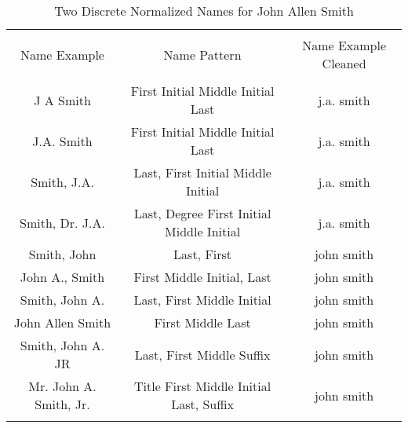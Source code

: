 
\begin{table}[!htbp] \centering 
  \caption{Two Discrete Normalized Names for John Allen Smith} 
  \label{} 
\footnotesize 
\begin{tabular}{@{\extracolsep{5pt}} ccc} 
\\[-1.8ex]\hline 
\hline \\[-1.8ex] 
Name Example & Name Pattern & Name Example Cleaned \\ 
\hline \\[-1.8ex] 
J A Smith & First Initial Middle Initial Last & j.a. smith \\ 
J.A. Smith & First Initial Middle Initial Last & j.a. smith \\ 
Smith, J.A. & Last, First Initial Middle Initial & j.a. smith \\ 
Smith, Dr. J.A. & Last, Degree First Initial Middle Initial & j.a. smith \\ 
Smith, John & Last, First & john smith \\ 
John A., Smith & First Middle Initial, Last & john smith \\ 
Smith, John A. & Last, First Middle Initial & john smith \\ 
John Allen Smith & First Middle Last & john smith \\ 
Smith, John A. JR & Last, First Middle Suffix & john smith \\ 
Mr. John A. Smith, Jr. & Title First Middle Initial Last, Suffix & john smith \\ 
\hline \\[-1.8ex] 
\end{tabular} 
\end{table}  
